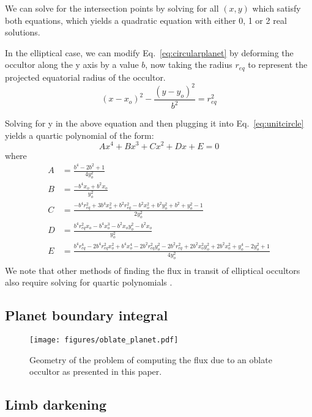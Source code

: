 \documentclass[twocolumn]{aastex631}
\begin{document}
We can solve for the intersection points by solving for all $(x,y)$ which satisfy both equations, which yields a quadratic equation with either 0, 1 or 2 real solutions.

In the elliptical case, we can modify Eq.~\ref{eq:circularplanet} by deforming the occultor along the y axis by a value $b$, now taking the radius $r_{eq}$ to represent the projected equatorial radius of the occultor. 
\begin{equation} \label{eq:ellipticalplanet}
(x-x_{o})^2-\frac{(y-y_o)^2}{b^2} = r_{eq}^2
\end{equation}

Solving for y in the above equation and then plugging it into Eq.~\ref{eq:unitcircle} yields a quartic polynomial of the form: 
\begin{equation} \label{eq:quarticform}
Ax^4 + Bx^3 + Cx^2 + Dx + E = 0
\end{equation} 
where
\begin{align*}
A &= \frac{b^4 - 2b^2 + 1}{4y_o^2}\\
B &= \frac{-b^4x_o + b^2x_o}{y_o^2}\\
C &= \frac{-b^4r_{eq}^2 + 3b^4x_o^2 + b^2r_{eq}^2 - b^2x_o^2 + b^2y_o^2 + b^2 + y_o^2 - 1}{2y_o^2} \\
D &= \frac{b^4r_{eq}^2x_o - b^4x_o^3 - b^2x_oy_o^2 - b^2x_o}{y_o^2} \\
E &= \frac{b^4r_{eq}^4 - 2b^4r_{eq}^2x_o^2 + b^4x_o^4 - 2b^2r_{eq}^2y_o^2 - 2b^2r_{eq}^2 + 2b^2x_o^2y_o^2 + 2b^2x_o^2 + y_o^4 - 2y_o^2 + 1}{4y_o^2}\\
\end{align*}
We note that other methods of finding the flux in transit of elliptical occultors also require solving for quartic polynomials \citep{rein2023}. 
\subsection{Planet boundary integral}

\begin{figure}[ht!]
    \begin{centering}
        \texttt{[image: figures/oblate\_planet.pdf]}
        \caption{Geometry of the problem of computing the flux due to an oblate occultor as presented in this paper. 
        }
        \label{fig:integral_bounds}
    \end{centering}
\end{figure}

\subsection{Limb darkening}
\end{document}
